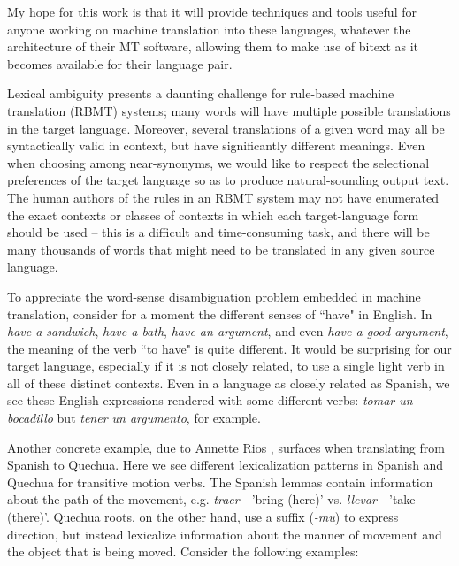 My hope for this work is that it will provide techniques and tools useful for
anyone working on machine translation into these languages, whatever the
architecture of their MT software, allowing them to make use of bitext as it
becomes available for their language pair.


Lexical ambiguity presents a daunting challenge for rule-based machine
translation (RBMT) systems;
many words will have multiple possible translations in the target language.
Moreover, several translations of a given word may all be syntactically valid
in context, but have significantly different meanings. Even when choosing among
near-synonyms, we would like to respect the selectional preferences of the
target language so as to produce natural-sounding output text. The human
authors of the rules in an RBMT system may not have enumerated the exact
contexts or classes of contexts in which each target-language form should be
used -- this is a difficult and time-consuming task, and there will be many
thousands of words that might need to be translated in any given source
language.

To appreciate the word-sense disambiguation problem embedded in machine
translation, consider for a moment the different senses of ``have" in
English. In \emph{have a sandwich}, \emph{have a bath}, \emph{have an
argument}, and even \emph{have a good argument}, the meaning of the verb ``to
have" is quite different. It would be surprising for our target language,
especially if it is not closely related, to use a single light verb in
all of these distinct contexts. Even in a language as closely related as
Spanish, we see these English expressions rendered with some different
verbs: \emph{tomar un bocadillo} but \emph{tener un argumento}, for example.

Another concrete example, due to Annette Rios \cite{rudnick:saltmil2014},
surfaces when translating from Spanish to Quechua. 
Here we see different lexicalization patterns in Spanish and Quechua
for transitive motion verbs. The Spanish lemmas contain information about the
path of the movement, e.g. {\em traer} - 'bring (here)' vs. {\em llevar} -
'take (there)'. Quechua roots, on the other hand, use a suffix ({\em -mu}) to
express direction, but instead lexicalize information about the manner of
movement and the object that is being moved.  Consider the following examples:


